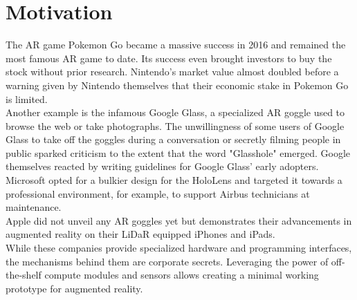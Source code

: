 \chapter{Motivation}

The AR game Pokemon Go became a massive success in 2016 and remained the most famous AR game to date. Its success even brought investors to buy the stock without prior research. Nintendo's market value almost doubled before a warning given by Nintendo themselves that their economic stake in Pokemon Go is limited.\cite{Nintendo_stock}\\ 
Another example is the infamous Google Glass, a specialized AR goggle used to browse the web or take photographs.\cite{Google_Glass} The unwillingness of some users of Google Glass to take off the goggles during a conversation or secretly filming people in public sparked criticism to the extent that the word "Glasshole" emerged.\cite{Glasshole} Google themselves reacted by writing guidelines for Google Glass’ early adopters.\cite{Glasshole}\\
Microsoft opted for a bulkier design for the HoloLens\cite{Hololens} and targeted it towards a professional environment, for example, to support Airbus technicians at maintenance\cite{AirbusHololens}.\\
Apple did not unveil any AR goggles yet but demonstrates their advancements in augmented reality on their LiDaR equipped iPhones and iPads.\cite{AppleLidar}\\
While these companies provide specialized hardware and programming interfaces, the mechanisms behind them are corporate secrets. Leveraging the power of off-the-shelf compute modules and sensors allows creating a minimal working prototype for augmented reality.

